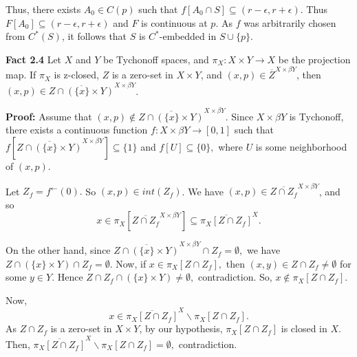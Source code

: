 \documentclass{article}
\begin{document}
\vskip 20pt
 
Thus, there exists $A_0\in C(p)$ such that $f\left[A_0\cap S\right]\subseteq (r-\epsilon, r+\epsilon).$ Thus $F[A_0]\subseteq (r-\epsilon, r+\epsilon)$ and $F$ is continuous at $p$. As $f$ was arbitrarily chosen from $C^*(S)$, it follows that $S$ is $C^*$-embedded in $S\cup\{p\}.$ 








\vskip 40pt














\textbf{Fact 2.4}  Let $X$ and $Y$ be Tychonoff spaces, and $\pi_X: X\times Y\rightarrow X$ be the projection map. If $\pi_X$ is z-closed, $Z$ is a zero-set in $X\times Y$, and $(x,p)\in \overline{Z}^{X\times \beta Y}$, then $(x,p)\in \overline{Z\cap \left(\{x\}\times Y\right)}^{X\times \beta Y}$.

\vskip 20pt
 
\textbf{Proof: }Assume that $(x,p)\notin \overline{Z\cap (\{x\}\times Y)}^{X\times \beta Y}.$ Since $X\times \beta Y$ is Tychonoff, there exists a continuous function $f: X\times \beta Y \rightarrow [0,1]$ such that $f\left[\overline{Z\cap (\{x\}\times Y)}^{X\times \beta Y}\right] \subseteq \{1\}$ and $f[U]\subseteq \{0\},$ where $U$ is some neighborhood of $(x,p).$ 

\vskip 15pt

Let $Z_f=f^{\leftarrow}(0).$ So $(x,p)\in int(Z_f)$. We have $(x,p)\in \overline{Z\cap Z_f}^{X\times \beta Y}$, and so
$$x\in \pi_X\left[\overline{Z\cap Z_f}^{X\times \beta Y}\right] \subseteq \overline{\pi_X\left[Z\cap Z_f\right]}^X.$$

\vskip 10pt

On the other hand, since $\overline{Z\cap(\{x\}\times Y)}^{X\times \beta Y} \cap Z_f = \emptyset, $ 
we have $Z\cap (\{x\}\times Y) \cap Z_f=\emptyset$. Now, if $x\in \pi_X\left[Z\cap Z_f\right],$ then $(x,y)\in Z\cap Z_f\neq \emptyset$ for some $y\in Y$. Hence 
$Z\cap Z_f\cap (\{x\}\times Y) \neq \emptyset,$  contradiction. So, $x\notin \pi_X\left[Z\cap Z_f\right]$.

\vskip 20pt

Now, $$x\in \overline{\pi_X\left[Z\cap Z_f\right]}^X \backslash \pi_X\left[Z\cap Z_f\right].$$
\vskip 5pt
As $Z\cap Z_f$ is a zero-set in $X\times Y$, by our hypothesis, $\pi_X\left[Z\cap Z_f\right]$ is closed in $X$. Then,  $\overline{\pi_X\left[Z\cap Z_f\right]}^X \backslash \pi_X\left[Z\cap Z_f\right]=\emptyset,$ contradiction.
\end{document}
